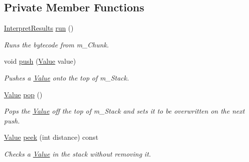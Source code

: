 \subsection*{Private Member Functions}
\begin{DoxyCompactItemize}
\item 
\hyperlink{_v_m_8h_ae6d9431ba75ad63e3dc378957e0aad8f}{Interpret\+Results} \hyperlink{class_v_m_ab7aa12a22363351fcf724a7a4b2a3d56}{run} ()
\begin{DoxyCompactList}\small\item\em Runs the bytecode from m\+\_\+\+Chunk. \end{DoxyCompactList}\item 
void \hyperlink{class_v_m_a80a5bb010fca8e1fc5e1108195fec425}{push} (\hyperlink{class_value}{Value} value)
\begin{DoxyCompactList}\small\item\em Pushes a \hyperlink{class_value}{Value} onto the top of m\+\_\+\+Stack. \end{DoxyCompactList}\item 
\hyperlink{class_value}{Value} \hyperlink{class_v_m_af5f97f93ca522dd02dbaba309fd1706c}{pop} ()
\begin{DoxyCompactList}\small\item\em Pops the \hyperlink{class_value}{Value} off the top of m\+\_\+\+Stack and sets it to be overwritten on the next push. \end{DoxyCompactList}\item 
\hyperlink{class_value}{Value} \hyperlink{class_v_m_aeebabdb7830a04e3cd54f33a8f8a8b14}{peek} (int distance) const
\begin{DoxyCompactList}\small\item\em Checks a \hyperlink{class_value}{Value} in the stack without removing it. \end{DoxyCompactList}\end{DoxyCompactItemize}
